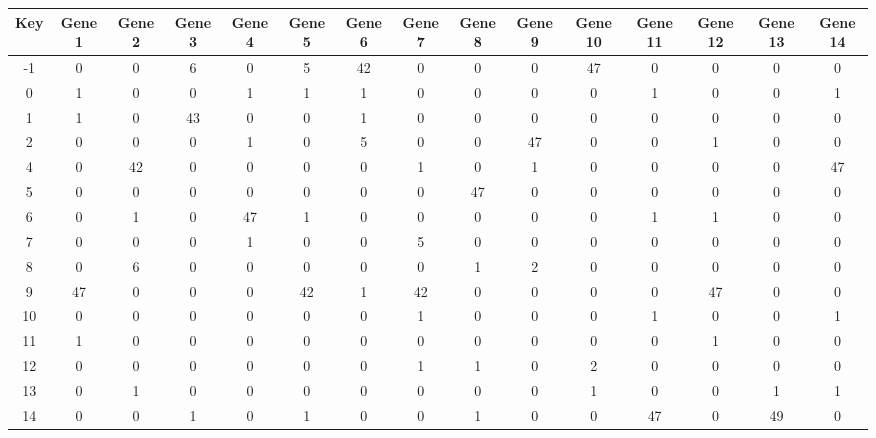 \begin{tabular}{|c|c|c|c|c|c|c|c|c|c|c|c|c|c|c|}
\hline
Key & Gene 1 & Gene 2 & Gene 3 & Gene 4 & Gene 5 & Gene 6 & Gene 7 & Gene 8 & Gene 9 & Gene 10 & Gene 11 & Gene 12 & Gene 13 & Gene 14 \\
\hline
-1 & 0 & 0 & 6 & 0 & 5 & 42 & 0 & 0 & 0 & 47 & 0 & 0 & 0 & 0 \\
0 & 1 & 0 & 0 & 1 & 1 & 1 & 0 & 0 & 0 & 0 & 1 & 0 & 0 & 1 \\
1 & 1 & 0 & 43 & 0 & 0 & 1 & 0 & 0 & 0 & 0 & 0 & 0 & 0 & 0 \\
2 & 0 & 0 & 0 & 1 & 0 & 5 & 0 & 0 & 47 & 0 & 0 & 1 & 0 & 0 \\
4 & 0 & 42 & 0 & 0 & 0 & 0 & 1 & 0 & 1 & 0 & 0 & 0 & 0 & 47 \\
5 & 0 & 0 & 0 & 0 & 0 & 0 & 0 & 47 & 0 & 0 & 0 & 0 & 0 & 0 \\
6 & 0 & 1 & 0 & 47 & 1 & 0 & 0 & 0 & 0 & 0 & 1 & 1 & 0 & 0 \\
7 & 0 & 0 & 0 & 1 & 0 & 0 & 5 & 0 & 0 & 0 & 0 & 0 & 0 & 0 \\
8 & 0 & 6 & 0 & 0 & 0 & 0 & 0 & 1 & 2 & 0 & 0 & 0 & 0 & 0 \\
9 & 47 & 0 & 0 & 0 & 42 & 1 & 42 & 0 & 0 & 0 & 0 & 47 & 0 & 0 \\
10 & 0 & 0 & 0 & 0 & 0 & 0 & 1 & 0 & 0 & 0 & 1 & 0 & 0 & 1 \\
11 & 1 & 0 & 0 & 0 & 0 & 0 & 0 & 0 & 0 & 0 & 0 & 1 & 0 & 0 \\
12 & 0 & 0 & 0 & 0 & 0 & 0 & 1 & 1 & 0 & 2 & 0 & 0 & 0 & 0 \\
13 & 0 & 1 & 0 & 0 & 0 & 0 & 0 & 0 & 0 & 1 & 0 & 0 & 1 & 1 \\
14 & 0 & 0 & 1 & 0 & 1 & 0 & 0 & 1 & 0 & 0 & 47 & 0 & 49 & 0 \\
\hline
\end{tabular}